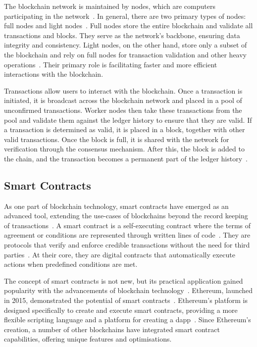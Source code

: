 The blockchain network is maintained by nodes, which are computers participating in the network~\cite{Xiong.2022}. In general, there are two primary types of nodes: full nodes and light nodes~\cite{Mitra.2021}. Full nodes store the entire blockchain and validate all transactions and blocks. They serve as the network's backbone, ensuring data integrity and consistency. Light nodes, on the other hand, store only a subset of the blockchain and rely on full nodes for transaction validation and other heavy operations~\cite{Mitra.2021}. Their primary role is facilitating faster and more efficient interactions with the blockchain.

Transactions allow users to interact with the blockchain. Once a transaction is initiated, it is broadcast across the blockchain network and placed in a pool of unconfirmed transactions. Worker nodes then take these transactions from the pool and validate them against the ledger history to ensure that they are valid. If a transaction is determined as valid, it is placed in a block, together with other valid transactions. Once the block is full, it is shared with the network for verification through the consensus mechanism. After this, the block is added to the chain, and the transaction becomes a permanent part of the ledger history~\cite{Xiong.2022}.

\subsection{Smart Contracts}
As one part of blockchain technology, smart contracts have emerged as an advanced tool, extending the use-cases of blockchains beyond the record keeping of transactions~\cite{UchaniGutierrez.2023}. A smart contract is a self-executing contract where the terms of agreement or conditions are represented through written lines of code~\cite{Zhou.2022}. They are protocols that verify and enforce credible transactions without the need for third parties~\cite{Zhou.2022}. At their core, they are digital contracts that automatically execute actions when predefined conditions are met.

The concept of smart contracts is not new, but its practical application gained popularity with the advancements of blockchain technology~\cite{Pierro.}. Ethereum, launched in 2015, demonstrated the potential of smart contracts~\cite{Pierro.}. Ethereum's platform is designed specifically to create and execute smart contracts, providing a more flexible scripting language and a platform for creating a \gls{dapp}~\cite{Pierro.}. Since Ethereum's creation, a number of other blockchains have integrated smart contract capabilities, offering unique features and optimisations.

